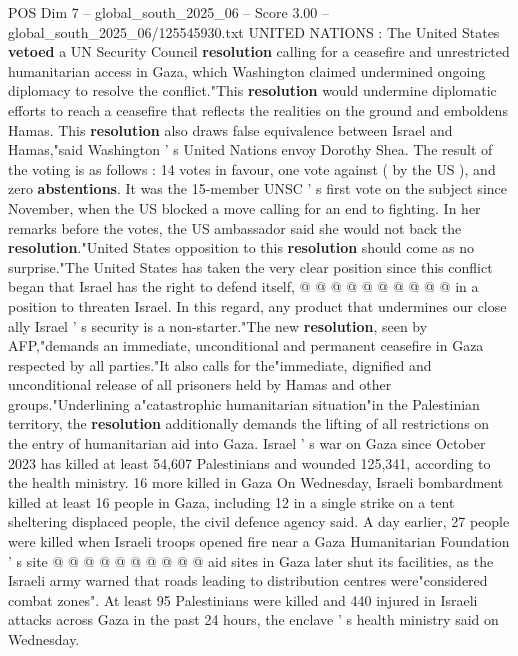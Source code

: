 \begin{textsample}{POS Dim 7 – global\_south\_2025\_06 – Score 3.00 – global\_south\_2025\_06/125545930.txt}  \label{ex:f7_pos_173}
UNITED NATIONS : The United States \textbf{vetoed} a UN Security Council \textbf{resolution} calling for a ceasefire and unrestricted humanitarian access in Gaza, which Washington claimed undermined ongoing diplomacy to resolve the conflict."This \textbf{resolution} would undermine diplomatic efforts to reach a ceasefire that reflects the realities on the ground and emboldens Hamas.
This \textbf{resolution} also draws false equivalence between Israel and Hamas,"said Washington ' s United Nations envoy Dorothy Shea.
The result of the voting is as follows : 14 votes in favour, one vote against ( by the US ), and zero \textbf{abstentions}.
It was the 15-member UNSC ' s first vote on the subject since November, when the US blocked a move calling for an end to fighting.
In her remarks before the votes, the US ambassador said she would not back the \textbf{resolution}."United States opposition to this \textbf{resolution} should come as no surprise."The United States has taken the very clear position since this conflict began that Israel has the right to defend itself, @ @ @ @ @ @ @ @ @ @ in a position to threaten Israel.
In this regard, any product that undermines our close ally Israel ' s security is a non-starter."The new \textbf{resolution}, seen by AFP,"demands an immediate, unconditional and permanent ceasefire in Gaza respected by all parties."It also calls for the"immediate, dignified and unconditional release of all prisoners held by Hamas and other groups."Underlining a"catastrophic humanitarian situation"in the Palestinian territory, the \textbf{resolution} additionally demands the lifting of all restrictions on the entry of humanitarian aid into Gaza.
Israel ' s war on Gaza since October 2023 has killed at least 54,607 Palestinians and wounded 125,341, according to the health ministry. 16 more killed in Gaza On Wednesday, Israeli bombardment killed at least 16 people in Gaza, including 12 in a single strike on a tent sheltering displaced people, the civil defence agency said.
A day earlier, 27 people were killed when Israeli troops opened fire near a Gaza Humanitarian Foundation ' s site @ @ @ @ @ @ @ @ @ @ aid sites in Gaza later shut its facilities, as the Israeli army warned that roads leading to distribution centres were"considered combat zones".
At least 95 Palestinians were killed and 440 injured in Israeli attacks across Gaza in the past 24 hours, the enclave ' s health ministry said on Wednesday.

\end{textsample}
